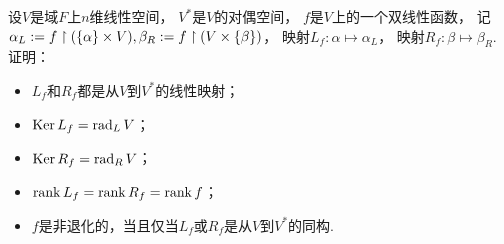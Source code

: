 \begin{example}
\def\fL{\alpha_L}  %
\def\fR{\beta_R}  %
\def\Lf{L_f}  %
\def\Rf{R_f}  %
设\(V\)是域\(F\)上\(n\)维线性空间，
\(V^*\)是\(V\)的对偶空间，
\(f\)是\(V\)上的一个双线性函数，
记\(\alpha_L := f \upharpoonright (\{\alpha\} \times V),
\beta_R := f \upharpoonright (V \times \{\beta\})\)，
映射\(\Lf\colon \alpha \mapsto \fL\)，
映射\(\Rf\colon \beta \mapsto \fR\).
证明：\begin{itemize}
	\item \(\Lf\)和\(\Rf\)都是从\(V\)到\(V^*\)的线性映射；
	\item \(\Ker \Lf = \Rad_L V\)；
	\item \(\Ker \Rf = \Rad_R V\)；
	\item \(\rank \Lf = \rank \Rf = \rank f\)；
	\item \(f\)是非退化的，当且仅当\(\Lf\)或\(\Rf\)是从\(V\)到\(V^*\)的同构.
\end{itemize}
\end{example}

